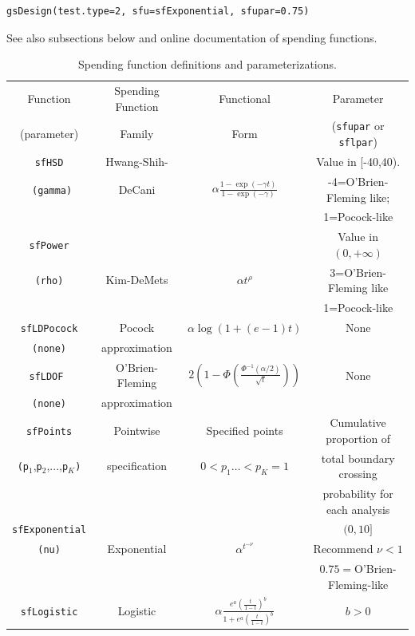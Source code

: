 \bigskip

\begin{verbatim}
gsDesign(test.type=2, sfu=sfExponential, sfupar=0.75)
\end{verbatim}
\bigskip

See also subsections below and online documentation of spending functions.

\bigskip

\begin{table}
\caption{Spending function definitions and parameterizations.}
\begin{tabular}
[c]{cccc}\hline
Function & Spending Function & Functional & Parameter\\
(parameter) & Family & Form & (\texttt{sfupar} or \texttt{sflpar})\\\hline
\texttt{sfHSD} & Hwang-Shih- &  & Value in [-40,40).\\
\texttt{\ (gamma)} & DeCani & $\alpha\frac{1-\exp(-\gamma t)}{1-\exp(-\gamma
)}$ & -4=O'Brien-Fleming like;\\
&  &  & 1=Pocock-like\\\hline
\texttt{sfPower} &  &  & Value in $(0,+\infty)$\\
\texttt{(rho)} & Kim-DeMets & $\alpha t^{\rho}$ & 3=O'Brien-Fleming like\\
&  &  & 1=Pocock-like\\\hline
\texttt{sfLDPocock} & Pocock & $\alpha\log(1+(e-1)t)$ & None\\
\texttt{(none)} & approximation &  & \\\hline
\texttt{sfLDOF } & O'Brien-Fleming & $2\left(  1-\Phi\left(  \frac{\Phi
^{-1}(\alpha/2)}{\sqrt{t}}\right)  \right)  $ & None\\
\texttt{(none)} & approximation &  & \\\hline
\texttt{sfPoints} & Pointwise & Specified points & Cumulative proportion of\\
\texttt{(p}$_{1}$,\texttt{p}$_{2}$,...,\texttt{p}$_{K}$\texttt{)} &
specification & $0<p_{1}\ldots<p_{K}=1$ & total boundary crossing\\
&  &  & probability for each analysis\\\hline
\texttt{sfExponential} &  &  & $(0,10]$\\
\texttt{(nu)} & Exponential & $\alpha^{t^{-\nu}}$ & Recommend $\nu<1$\\
&  &  & $0.75=$O'Brien-Fleming-like\\\hline
\texttt{sfLogistic} & Logistic & $\alpha\frac{e^{a}\left(  \frac{t}
{1-t}\right)  ^{b}}{1+e^{a}\left(  \frac{t}{1-t}\right)  ^{b}}$ & $b>0$\\

\end{tabular}
\end{table}
